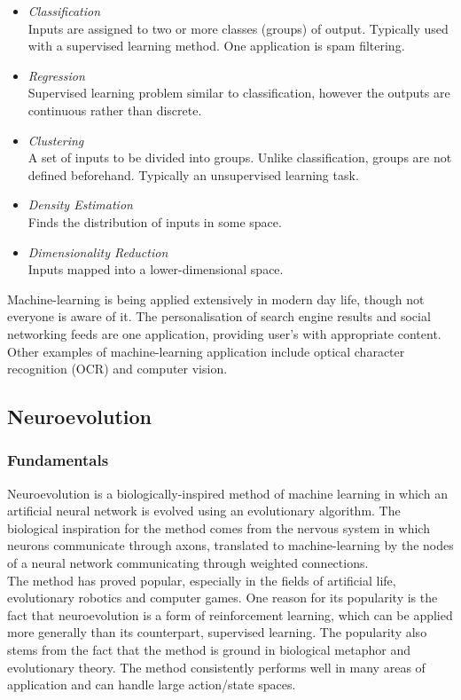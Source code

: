 \documentclass[11pt,a4paper]{article}
\begin{document}
\begin{itemize}
\item \emph{Classification}\\
Inputs are assigned to two or more classes (groups) of output. Typically used with a supervised learning method. One application is spam filtering.
\item \emph{Regression}\\
Supervised learning problem similar to classification, however the outputs are continuous rather than discrete.
\item \emph{Clustering}\\
A set of inputs to be divided into groups. Unlike classification, groups are not defined beforehand. Typically an unsupervised learning task.
\item \emph{Density Estimation}\\
Finds the distribution of inputs in some space.
\item \emph{Dimensionality Reduction}\\
Inputs mapped into a lower-dimensional space.\\
\end{itemize}
Machine-learning is being applied extensively in modern day life, though not everyone is aware of it. The personalisation of search engine results and social networking feeds are one application, providing user's with appropriate content. \cite{search} Other examples of machine-learning application include optical character recognition (OCR) and computer vision. \cite{ocr}
\newpage
\subsection{Neuroevolution}
\subsubsection{Fundamentals}
Neuroevolution is a biologically-inspired method of machine learning in which an artificial neural network is evolved using an evolutionary algorithm. The biological inspiration for the method comes from the nervous system in which neurons communicate through axons, translated to machine-learning by the nodes of a neural network communicating through weighted connections.\\

The method has proved popular, especially in the fields of artificial life, evolutionary robotics and computer games. One reason for its popularity is the fact that neuroevolution is a form of reinforcement learning, which can be applied more generally than its counterpart, supervised learning. The popularity also stems from the fact that the method is ground in biological metaphor and evolutionary theory. The method consistently performs well in many areas of application and can handle large action/state spaces. \cite{risi}\\
\end{document}

